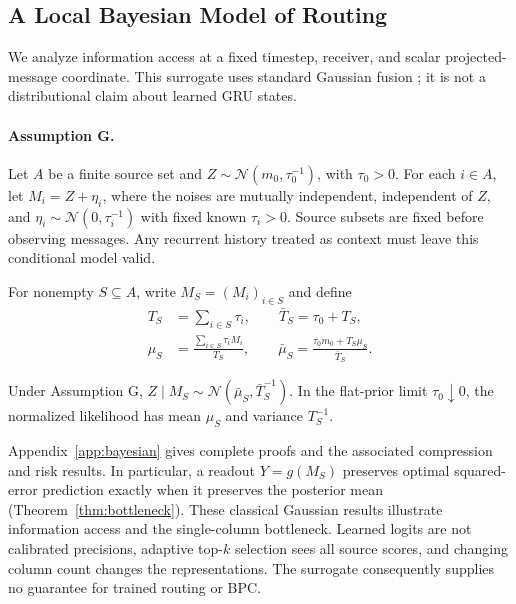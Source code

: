 \subsection{A Local Bayesian Model of Routing}\label{sec:bayesian}

We analyze information access at a fixed timestep, receiver, and scalar projected-message coordinate. This surrogate uses standard Gaussian fusion \citep{murphy2007gaussian}; it is not a distributional claim about learned GRU states.

\paragraph{Assumption G.}
Let $A$ be a finite source set and $Z\sim\mathcal{N}(m_0,\tau_0^{-1})$, with $\tau_0>0$. For each $i\in A$, let $M_i=Z+\eta_i$, where the noises are mutually independent, independent of $Z$, and $\eta_i\sim\mathcal{N}(0,\tau_i^{-1})$ with fixed known $\tau_i>0$. Source subsets are fixed before observing messages. Any recurrent history treated as context must leave this conditional model valid.

For nonempty $S\subseteq A$, write $M_S=(M_i)_{i\in S}$ and define
\begin{equation}\label{eq:bayesian-definitions}
\begin{aligned}
T_S &= \sum_{i\in S}\tau_i,\qquad \bar T_S=\tau_0+T_S,\\
\mu_S &= \frac{\sum_{i\in S}\tau_i M_i}{T_S},\qquad
\bar\mu_S=\frac{\tau_0m_0+T_S\mu_S}{\bar T_S}.
\end{aligned}
\end{equation}

\begin{mosaictheorem}\label{thm:posterior-fusion}
Under Assumption G, $Z\mid M_S\sim\mathcal{N}(\bar\mu_S,\bar T_S^{-1})$. In the flat-prior limit $\tau_0\downarrow0$, the normalized likelihood has mean $\mu_S$ and variance $T_S^{-1}$.
\end{mosaictheorem}

Appendix~\ref{app:bayesian} gives complete proofs and the associated compression and risk results. In particular, a readout $Y=g(M_S)$ preserves optimal squared-error prediction exactly when it preserves the posterior mean (Theorem~\ref{thm:bottleneck}). These classical Gaussian results illustrate information access and the single-column bottleneck. Learned logits are not calibrated precisions, adaptive top-$k$ selection sees all source scores, and changing column count changes the representations. The surrogate consequently supplies no guarantee for trained routing or BPC.
